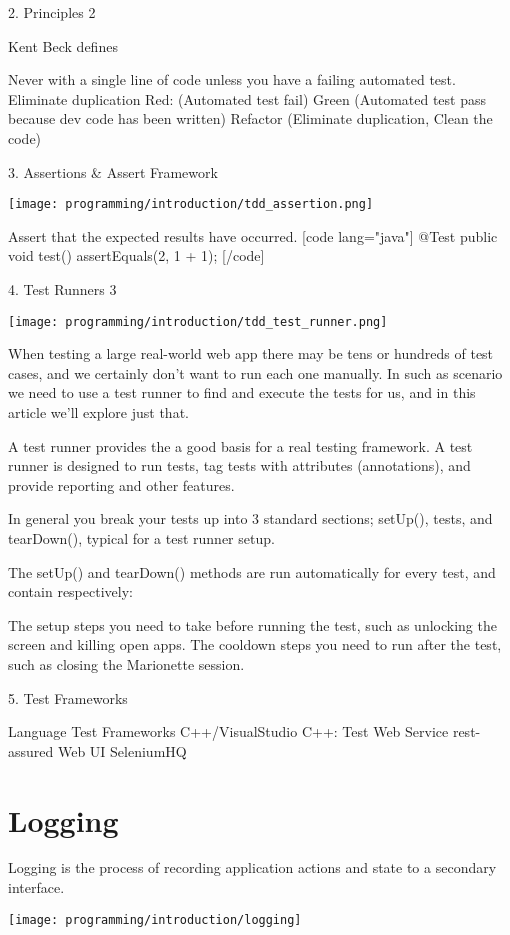2. Principles 2

Kent Beck defines

Never with a single line of code unless you have a failing automated test.
Eliminate duplication
Red: (Automated test fail) Green (Automated test pass because dev code has been written) Refactor (Eliminate duplication, Clean the code)

3. Assertions & Assert Framework

\texttt{[image: programming/introduction/tdd\_assertion.png]}

Assert that the expected results have occurred.
[code lang="java"] @Test public void test() { assertEquals(2, 1 + 1); } [/code]


4. Test Runners 3

\texttt{[image: programming/introduction/tdd\_test\_runner.png]}

When testing a large real-world web app there may be tens or hundreds of test cases, and we certainly don't want to run each one manually. In such as scenario we need to use a test runner to find and execute the tests for us, and in this article we'll explore just that.

A test runner provides the a good basis for a real testing framework. A test runner is designed to run tests, tag tests with attributes (annotations), and provide reporting and other features.

In general you break your tests up into 3 standard sections; setUp(), tests, and tearDown(), typical for a test runner setup.

The setUp() and tearDown() methods are run automatically for every test, and contain respectively:

The setup steps you need to take before running the test, such as unlocking the screen and killing open apps.
The cooldown steps you need to run after the test, such as closing the Marionette session.

5. Test Frameworks

Language	Test Frameworks
C++/VisualStudio	C++: Test
Web Service	rest-assured
Web UI	SeleniumHQ

\section{Logging}

Logging is the process of recording application actions and state to a secondary interface.

\texttt{[image: programming/introduction/logging]}


